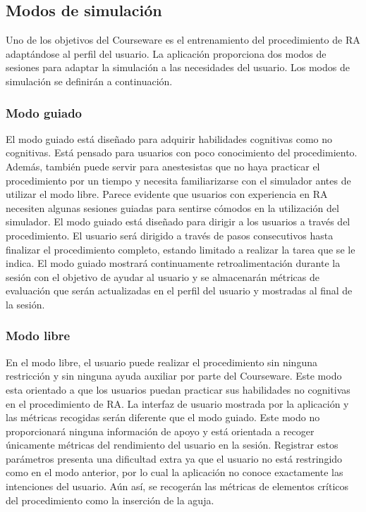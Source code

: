 \subsection{Modos de simulación}
\label{course:modos}
Uno de los objetivos del \ac{Courseware} es el entrenamiento del procedimiento de \ac{RA} adaptándose al perfil del usuario. La aplicación proporciona dos modos de sesiones para adaptar la simulación a las necesidades del usuario. Los modos de simulación se definirán a continuación.

\subsubsection{Modo guiado}

El modo guiado está diseñado para adquirir habilidades cognitivas como no cognitivas. Está pensado para usuarios con poco conocimiento del procedimiento. Además, también puede servir para anestesistas que no haya practicar el procedimiento por un tiempo y necesita familiarizarse con el simulador antes de utilizar el modo libre. Parece evidente que usuarios con experiencia en \ac{RA} necesiten algunas sesiones guiadas para sentirse cómodos en la utilización del simulador. 
El modo guiado está diseñado para dirigir a los usuarios a través del procedimiento. El usuario será dirigido a través de pasos consecutivos hasta finalizar el procedimiento completo, estando limitado a realizar la tarea que se le indica. El modo guiado mostrará continuamente retroalimentación durante la sesión con el objetivo de ayudar al usuario  y se almacenarán métricas de evaluación que serán actualizadas en el perfil del usuario y mostradas al final de la sesión.


\subsubsection{Modo libre}

En el modo libre, el usuario puede realizar el procedimiento sin ninguna restricción y sin ninguna ayuda auxiliar por parte del \ac{Courseware}. Este modo esta orientado a que los usuarios puedan practicar sus habilidades no cognitivas en el procedimiento de \ac{RA}. La interfaz de usuario mostrada por la aplicación  y las métricas recogidas serán diferente que el modo guiado. Este modo no proporcionará ninguna información de apoyo y está orientada a recoger únicamente métricas del rendimiento del usuario en la sesión. Registrar estos parámetros presenta una dificultad extra ya que el usuario no está restringido como en el modo anterior, por lo cual la aplicación no conoce exactamente las intenciones del usuario. Aún así, se recogerán las métricas de elementos críticos del procedimiento como la inserción de la aguja.

